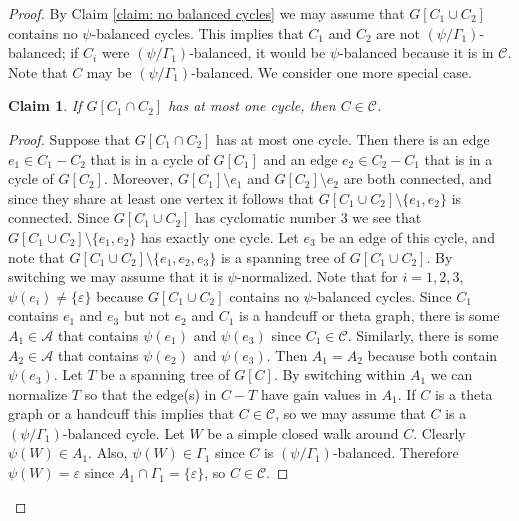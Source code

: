 \documentclass[10pt,a4paper]{amsart}
\newtheorem{claim}{Claim}
\newcommand{\cA}{\mathcal{A}}
\newcommand{\cC}{\mathcal{C}}
\newcommand{\del}{\!\setminus\!}
\newcommand{\ep}{\varepsilon}
\begin{document}
\begin{proof}
By Claim \ref{claim: no balanced cycles} we may assume that $G[C_1 \cup C_2]$ contains no $\psi$-balanced cycles. 
This implies that $C_1$ and $C_2$ are not $(\psi/\Gamma_1)$-balanced; if $C_i$ were $(\psi/\Gamma_1)$-balanced, it would be $\psi$-balanced because it is in $\cC$.
Note that $C$ may be $(\psi/\Gamma_1)$-balanced.
We consider one more special case.

\begin{claim} \label{claim: only one cycle}
If $G[C_1 \cap C_2]$ has at most one cycle, then $C \in \cC$.
\end{claim}
\begin{proof}
Suppose that $G[C_1 \cap C_2]$ has at most one cycle.
Then there is an edge $e_1 \in C_1 - C_2$ that is in a cycle of $G[C_1]$ and an edge $e_2 \in C_2 - C_1$ that is in a cycle of $G[C_2]$.
Moreover, $G[C_1] \del e_1$ and $G[C_2] \del e_2$ are both connected, and since they share at least one vertex it follows that $G[C_1 \cup C_2] \del \{e_1, e_2\}$ is connected.
Since $G[C_1 \cup C_2]$ has cyclomatic number $3$ we see that $G[C_1 \cup C_2] \del \{e_1, e_2\}$ has exactly one cycle.
Let $e_3$ be an edge of this cycle, and note that $G[C_1 \cup C_2] \del \{e_1, e_2, e_3\}$ is a spanning tree of $G[C_1 \cup C_2]$.
By switching we may assume that it is $\psi$-normalized.
Note that for $i = 1,2,3$, $\psi(e_i) \ne \{\ep\}$ because $G[C_1 \cup C_2]$ contains no $\psi$-balanced cycles.
Since $C_1$ contains $e_1$ and $e_3$ but not $e_2$ and $C_1$ is a handcuff or theta graph, there is some $A_1 \in \cA$ that contains $\psi(e_1)$ and $\psi(e_3)$ since $C_1 \in \cC$.
Similarly, there is some $A_2 \in \cA$ that contains $\psi(e_2)$ and $\psi(e_3)$.
Then $A_1 = A_2$ because both contain $\psi(e_3)$.
Let $T$ be a spanning tree of $G[C]$.
By switching within $A_1$ we can normalize $T$ so that the edge(s) in $C - T$ have gain values in $A_1$.
If $C$ is a theta graph or a handcuff this implies that $C \in \cC$, so we may assume that $C$ is a $(\psi/\Gamma_1)$-balanced cycle.
Let $W$ be a simple closed walk around $C$.
Clearly $\psi(W) \in A_1$.
Also, $\psi(W) \in \Gamma_1$ since $C$ is $(\psi/\Gamma_1)$-balanced.
Therefore $\psi(W) = \ep$ since $A_1 \cap \Gamma_1 = \{\ep\}$, so $C \in \cC$.
\end{proof}


\end{proof}
\end{document}
